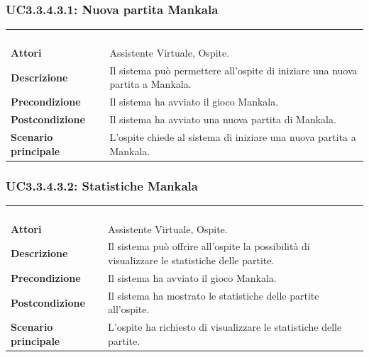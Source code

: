 \subsubsection{UC3.3.4.3.1: Nuova partita Mankala}
\label{UC3.3.4.3.1}
\begin{longtable}{l|p{10cm}}
\rowcolor[gray]{0.8} \multicolumn{2}{c}{} \\
\rowcolor[gray]{0.8} \multicolumn{2}{c}{\textbf{UC3.3.4.3.1 - Nuova partita Mankala}} \\
\rowcolor[gray]{0.8} \multicolumn{2}{c}{} \\
\hline
&\\
\textbf{Attori} & Assistente Virtuale, Ospite.\\[7pt]
\textbf{Descrizione} & Il sistema può permettere all'ospite di iniziare una nuova partita a Mankala.\\[7pt]
\textbf{Precondizione} & Il sistema ha avviato il gioco Mankala.\\[7pt]
\textbf{Postcondizione} & Il sistema ha avviato una nuova partita di Mankala.\\[7pt]
\textbf{Scenario principale} &L'ospite chiede al sistema di iniziare una nuova partita a Mankala.\\[7pt]\hline
\end{longtable}

\subsubsection{UC3.3.4.3.2: Statistiche Mankala}
\label{UC3.3.4.3.2}
\begin{longtable}{l|p{10cm}}
\rowcolor[gray]{0.8} \multicolumn{2}{c}{} \\
\rowcolor[gray]{0.8} \multicolumn{2}{c}{\textbf{UC3.3.4.3.2 - Statistiche Mankala}} \\
\rowcolor[gray]{0.8} \multicolumn{2}{c}{} \\
\hline
&\\
\textbf{Attori} & Assistente Virtuale, Ospite.\\[7pt]
\textbf{Descrizione} & Il sistema può offrire all'ospite la possibilità di visualizzare le statistiche delle partite.\\[7pt]
\textbf{Precondizione} & Il sistema ha avviato il gioco Mankala.\\[7pt]
\textbf{Postcondizione} & Il sistema ha mostrato le statistiche delle partite all'ospite.\\[7pt]
\textbf{Scenario principale} &L'ospite ha richiesto di visualizzare le statistiche delle partite.\\[7pt]\hline
\end{longtable}


